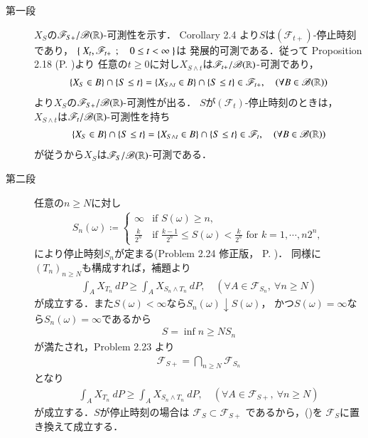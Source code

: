	\begin{prf}\mbox{}
		\begin{description}
			\item[第一段]
				$X_S$の$\mathscr{F}_{S+}/\mathscr{B}(\mathbb{R})$-可測性を示す．
				Corollary 2.4 より$S$は$(\mathscr{F}_{t+})$-停止時刻であり，
				$\left\{\ X_t,\mathscr{F}_{t+}\ \, ; \quad 0 \leq t < \infty\ \right\}$は
				発展的可測である．従って
				Proposition 2.18 (P. \pageref{chapter_1_Problem_2_18})より
				任意の$t \geq 0$に対し$X_{S \wedge t}$は$\mathscr{F}_{t+}/\mathscr{B}(\mathbb{R})$-可測であり，
				\begin{align}
					\{X_S \in B\} \cap \{S \leq t\}
					= \{X_{S \wedge t} \in B\} \cap \{S \leq t\}
					\in \mathscr{F}_{t+},
					\quad (\forall B \in \mathscr{B}(\mathbb{R}))
				\end{align}
				より$X_S$の$\mathscr{F}_{S+}/\mathscr{B}(\mathbb{R})$-可測性が出る．
				$S$が$(\mathscr{F}_t)$-停止時刻のときは，
				$X_{S \wedge t}$は$\mathscr{F}_t/\mathscr{B}(\mathbb{R})$-可測性を持ち
				\begin{align}
					\{X_S \in B\} \cap \{S \leq t\}
					= \{X_{S \wedge t} \in B\} \cap \{S \leq t\}
					\in \mathscr{F}_t,
					\quad (\forall B \in \mathscr{B}(\mathbb{R}))
				\end{align}
				が従うから$X_S$は$\mathscr{F}_S/\mathscr{B}(\mathbb{R})$-可測である．
			
			\item[第二段]
				任意の$n \geq N$に対し
				\begin{align}
					S_n(\omega) \coloneqq
					\begin{cases}
						\infty & \mbox{if $S(\omega) \geq n$}, \\
						\displaystyle\frac{k}{2^n} & \mbox{if $\displaystyle\frac{k-1}{2^n} \leq S(\omega) < \frac{k}{2^n}$ for $k=1,\cdots,n2^n$},
					\end{cases}
				\end{align}
				により停止時刻$S_n$が定まる(Problem 2.24 修正版， P. \pageref{chapter_1_Problem_2_24})．
				同様に$(T_n)_{n \geq N}$も構成すれば，補題より
				\begin{align}
					\int_A X_{T_n}\ dP \geq \int_A X_{S_n \wedge T_n}\ dP,
					\quad (\forall A \in \mathscr{F}_{S_n},\ \forall n \geq N)
				\end{align}
				が成立する．また$S(\omega) < \infty$なら$S_n(\omega) \downarrow S(\omega)$，
				かつ$S(\omega) = \infty$なら$S_n(\omega) = \infty$であるから
				\begin{align}
					S = \inf{n \geq N}{S_n}
				\end{align}
				が満たされ，Problem 2.23 より
				\begin{align}
					\mathscr{F}_{S+} = \bigcap_{n \geq N} \mathscr{F}_{S_n}
				\end{align}
				となり
				\begin{align}
					\int_A X_{T_n}\ dP \geq \int_A X_{S_n \wedge T_n}\ dP,
					\quad (\forall A \in \mathscr{F}_{S+},\ \forall n \geq N)
					\label{eq:chapter_1_Theorem_3_22_1}
				\end{align}
				が成立する．$S$が停止時刻の場合は
				$\mathscr{F}_S \subset \mathscr{F}_{S+}$
				であるから，()を
				$\mathscr{F}_S$に置き換えて成立する．
			

\end{description}
\end{prf}
